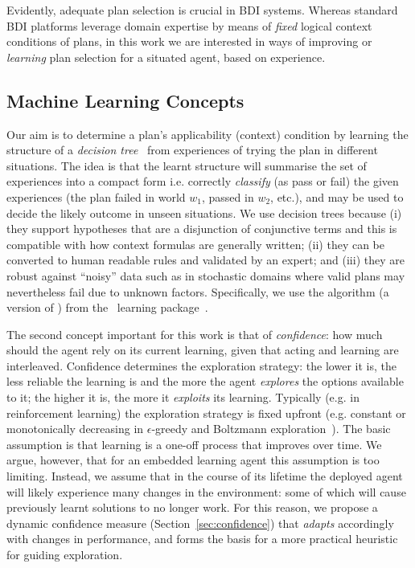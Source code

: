 Evidently, adequate plan selection is crucial in BDI systems. Whereas standard BDI platforms leverage domain expertise by means of \emph{fixed} logical context conditions of plans, in this work we are interested in ways of improving or \emph{learning} plan selection for a situated agent, based on experience.

\subsection{Machine Learning Concepts}

Our aim is to determine a plan's applicability (context) condition by learning the structure of a {\em decision tree}~\cite{Mitchell97:ML} from experiences of trying the plan in different situations. The idea is that the learnt structure will summarise the set of experiences into a compact form i.e. correctly {\em classify} (as pass or fail) the given experiences (the plan failed in world $w_1$, passed in $w_2$, etc.), and may be used to decide the likely outcome in unseen situations.
%
We use decision trees because (i) they support hypotheses that are a disjunction of conjunctive terms and this is compatible with how context formulas are generally written; (ii) they can be converted to human readable rules and validated by an expert; and (iii) they are robust against ``noisy'' data such as in stochastic domains where valid plans may nevertheless fail due to unknown factors. 
%
Specifically, we use the algorithm  (a version of ) from the \weka\ learning package~\cite{weka99}.



The second concept important for this work is that of {\em confidence}: how much should the agent rely on its current learning, given that acting and learning are interleaved. Confidence determines the exploration strategy: the lower it is, the less reliable the learning is and the more the agent {\em explores} the options available to it; the higher it is, the more it {\em exploits} its learning. Typically (e.g. in reinforcement learning) the exploration strategy is fixed upfront (e.g. constant or monotonically decreasing in $\epsilon$-greedy and Boltzmann exploration~\cite{sutton98:reinforcement}). The basic assumption is that learning is a one-off process that improves over time. We argue, however, that for an embedded learning agent this assumption is too limiting. Instead, we assume that in the course of its lifetime the deployed agent will likely experience many changes in the environment: some of which will cause previously learnt solutions to no longer work. For this reason, we propose a dynamic confidence measure (Section~\ref{sec:confidence}) that {\em adapts} accordingly with changes in performance, and forms the basis for a more practical heuristic for guiding exploration.
